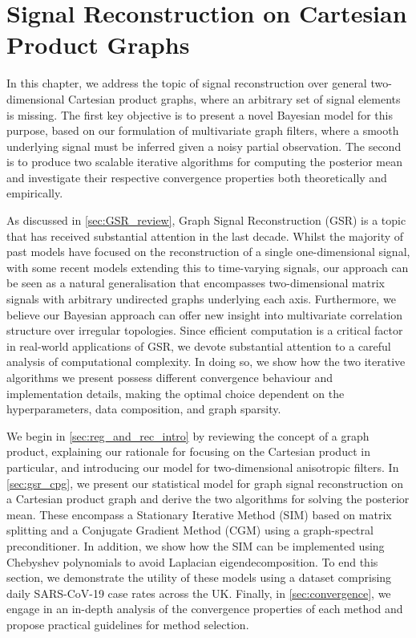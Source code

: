 \chapter{Signal Reconstruction on Cartesian Product Graphs}

\label{chap:gsr_2d}



In this chapter, we address the topic of signal reconstruction over general two-dimensional Cartesian product graphs, where an arbitrary set of signal elements is missing. The first key objective is to present a novel Bayesian model for this purpose, based on our formulation of multivariate graph filters, where a smooth underlying signal must be inferred given a noisy partial observation. The second is to produce two scalable iterative algorithms for computing the posterior mean and investigate their respective convergence properties both theoretically and empirically. 


As discussed in \cref{sec:GSR_review}, Graph Signal Reconstruction (GSR) is a topic that has received substantial attention in the last decade. Whilst the majority of past models have focused on the reconstruction of a single one-dimensional signal, with some recent models extending this to time-varying signals, our approach can be seen as a natural generalisation that encompasses two-dimensional matrix signals with arbitrary undirected graphs underlying each axis. Furthermore, we believe our Bayesian approach can offer new insight into multivariate correlation structure over irregular topologies. Since efficient computation is a critical factor in real-world applications of GSR, we devote substantial attention to a careful analysis of computational complexity. In doing so, we show how the two iterative algorithms we present possess different convergence behaviour and implementation details, making the optimal choice dependent on the hyperparameters, data composition, and graph sparsity. 



We begin in \cref{sec:reg_and_rec_intro} by reviewing the concept of a graph product, explaining our rationale for focusing on the Cartesian product in particular, and introducing our model for two-dimensional anisotropic filters. In \cref{sec:gsr_cpg}, we present our statistical model for graph signal reconstruction on a Cartesian product graph and derive the two algorithms for solving the posterior mean. These encompass a Stationary Iterative Method (SIM) based on matrix splitting and a Conjugate Gradient Method (CGM) using a graph-spectral preconditioner. In addition, we show how the SIM can be implemented using Chebyshev polynomials to avoid Laplacian eigendecomposition. To end this section, we demonstrate the utility of these models using a dataset comprising daily SARS-CoV-19 case rates across the UK. Finally, in \cref{sec:convergence}, we engage in an in-depth analysis of the convergence properties of each method and propose practical guidelines for method selection. 


